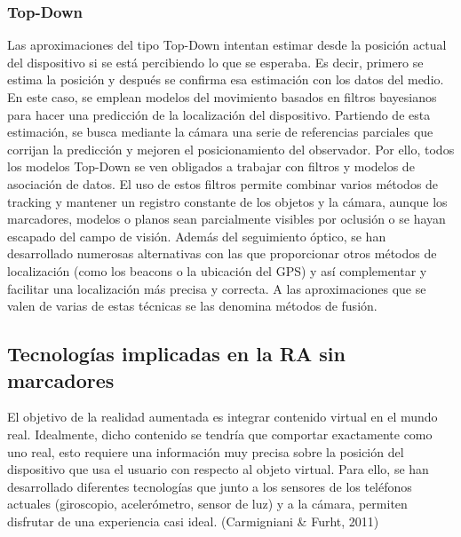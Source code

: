 \subsubsection{Top-Down}
Las aproximaciones del tipo Top-Down intentan estimar desde la posición actual del dispositivo si se está percibiendo lo que se esperaba. Es decir, primero se estima la posición y después se confirma esa estimación con los datos del medio.
En este caso, se emplean modelos del movimiento basados en filtros bayesianos para hacer una predicción de la localización del dispositivo. Partiendo de esta estimación, se busca mediante la cámara una serie de referencias parciales que corrijan la predicción y mejoren el posicionamiento del observador. Por ello, todos los modelos Top-Down se ven obligados a trabajar con filtros y modelos de asociación de datos.
El uso de estos filtros permite combinar varios métodos de tracking y mantener un registro constante de los objetos y la cámara, aunque los marcadores, modelos o planos sean parcialmente visibles por oclusión o se hayan escapado del campo de visión.
Además del seguimiento óptico, se han desarrollado numerosas alternativas con las que proporcionar otros métodos de localización (como los beacons o la ubicación del GPS) y así complementar y facilitar una localización más precisa y correcta. A las aproximaciones que se valen de varias de estas técnicas se las denomina métodos de fusión.

\subsection{Tecnologías implicadas en la RA sin marcadores}
El objetivo de la realidad aumentada es integrar contenido virtual en el mundo real. Idealmente, dicho contenido se tendría que comportar exactamente como uno real, esto requiere una información muy precisa sobre la posición del dispositivo que usa el usuario con respecto al objeto virtual. Para ello, se han desarrollado diferentes tecnologías que junto a los sensores de los teléfonos actuales (giroscopio, acelerómetro, sensor de luz) y a la cámara, permiten disfrutar de una experiencia casi ideal.  (Carmigniani & Furht, 2011)

